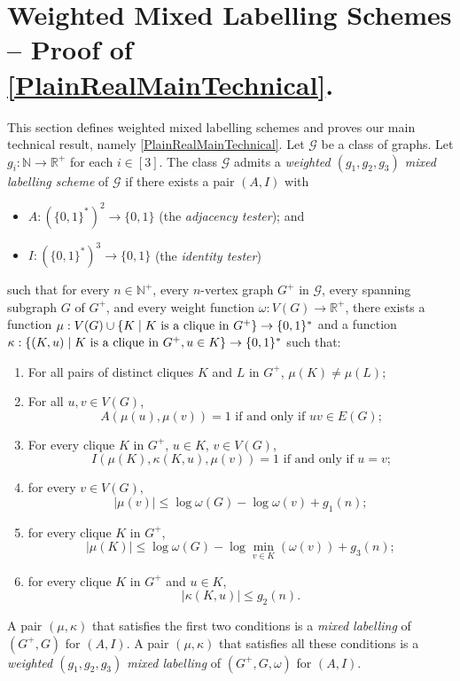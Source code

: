 \documentclass[twoside,leqno]{article}
\newcommand{\R}{\mathbb{R}}
\newcommand{\N}{\mathbb{N}}
\renewcommand{\le}{\leqslant}
\renewcommand{\leq}{\leqslant}
\newcommand{\defin}[1]{\emph{\textcolor{brightmaroon}{#1}}}
\DeclarePairedDelimiter{\set}{\{}{\}}
\begin{document}
\section{Weighted Mixed Labelling Schemes -- Proof of \texorpdfstring{\cref{PlainRealMainTechnical}}{Theorem \ref*{PlainRealMainTechnical}}.}
\label{weighted_mixed_section}
 
This section defines weighted mixed labelling schemes and proves our main technical result, namely \cref{PlainRealMainTechnical}. Let $\mathcal{G}$ be a class of graphs.
Let $g_i:\N\to\R^+$ for each $i\in[3]$.
The class  $\mathcal{G}$ admits a \defin{weighted $(g_1,g_2,g_3)$ mixed labelling scheme} of $\mathcal{G}$ if there exists a pair $(A,I)$ with
\begin{itemize}[nosep,nolistsep]
  \item $A:(\{0,1\}^*)^2\to\{0,1\}$ (the \defin{adjacency tester}); and
  \item $I:(\{0,1\}^*)^3\to\{0,1\}$ (the \defin{identity tester})
\end{itemize}
such that for every $n\in\N^+$, every $n$-vertex graph $G^+$ in $\mathcal{G}$, every spanning subgraph $G$ of $G^+$, and every weight function $\omega:V(G)\to \R^+$, there exists a function $\mu: V(G)\cup \{K\mid \text{$K$ is a clique in $G^+$}\} \to \set{0,1}^*$ and a function $\kappa:\{(K, u)\mid \text{$K$ is a clique in $G^+$}, u\in K\}\to \set{0,1}^*$ such that:
\begin{enumerate}[nosep,nolistsep,label=(\roman*)]
  \item For all pairs of distinct cliques $K$ and $L$ in $G^+$, $\mu(K)\neq\mu(L)$;
  \item For all $u,v\in V(G)$,
        \[
          \textrm{$A(\mu(u),\mu(v))=1$ if and only if $uv\in E(G)$;}
        \]
  \item For every clique $K$ in $G^+$, $u\in K$, $v\in V(G)$,
        \[
          \textrm{$I(\mu(K),\kappa(K, u),\mu(v))=1$ if and only if $u=v$;}
        \]
  \item for every $v\in V(G)$,
        \[
          |\mu(v)| \leq \log \omega(G) - \log\omega(v) + g_1(n);
        \]
  \item for every clique $K$ in $G^+$,
        \[
          |\mu(K)|\le \log \omega(G) - \log\min_{v\in K}(\omega(v)) + g_3(n);
        \]
  \item  for every clique $K$ in $G^+$ and $u\in K$,
        \[
          |\kappa(K, u)| \leq g_2(n).
        \]
\end{enumerate}
A pair $(\mu,\kappa)$ that satisfies the first two conditions is a \defin{mixed labelling} of $(G^+,G)$ for $(A,I)$.  A pair $(\mu,\kappa)$ that satisfies all these conditions is a \defin{weighted $(g_1,g_2,g_3)$ mixed labelling} of $(G^+,G,\omega)$ for $(A,I)$.
\end{document}
